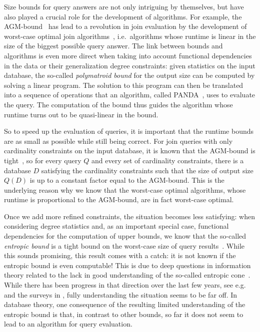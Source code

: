 \documentclass[a4paper,cleveref]{lipics-v2021}
\begin{document}
Size bounds for query answers are not only intriguing by themselves, but have also played a crucial role for the development of algorithms. For example, the AGM-bound~\cite{atserias2013size} has lead to a revolution in join evaluation by the development of worst-case optimal join algorithms~\cite{ngo2018worst,ngo2018worstb}, i.e.~algorithms whose runtime is linear in the size of the biggest possible query answer. The link between bounds and algorithms is even more direct when taking into account functional dependencies in the data or their generalization degree constraints: given statistics on the input database, the so-called \emph{polymatroid bound} for the output size can be computed by solving a linear program. The solution to this program can then be translated into a sequence of operations that an algorithm, called PANDA~\cite{Khamis0S17}, uses to evaluate the query. The computation of the bound thus guides the algorithm whose runtime turns out to be quasi-linear in the bound.

So to speed up the evaluation of queries, it is important that the runtime bounds are as small as possible while still being correct. For join queries with only cardinality constraints on the input database, it is known that the AGM-bound is tight~\cite{atserias2013size}, so for every query $Q$ and every set of cardinality constraints, there is a database $D$ satisfying the cardinality constraints such that the size of output size $Q(D)$ is up to a constant factor equal to the AGM-bound. This is the underlying reason why we know that the worst-case optimal algorithms, whose runtime is proportional to the AGM-bound, are in fact worst-case optimal.

Once we add more refined constraints, the situation becomes less satisfying: when considering degree statistics and, as an important special case, functional dependencies for the computation of upper bounds, we know that the so-called \emph{entropic bound} is a tight bound on the worst-case size of query results~\cite{Khamis0S17,Suciu23}. While this sounds promising, this result comes with a catch: it is not known if the entropic bound is even computable! This is due to deep questions in information theory related to the lack in good understanding of the so-called entropic cone~\cite{Yeung12}. While there has been progress in that direction over the last few years, see e.g.~\cite{zhang1998characterization,makarychev2002new,matus2007infinitely,dougherty2011non,matuvs2016entropy,csirmaz2025exploring,laszlo2026information} 
and the surveys in \cite{yeung2003first,yeung2015facets,chan2011recent},
fully understanding the situation seems to be far off. In database theory, one consequence of the resulting limited understanding of the entropic bound is that, in contrast to other bounds, so far it does not seem to lead to an algorithm for query evaluation.
\end{document}
